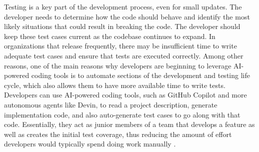 \documentclass[conference]{IEEEtran}
\begin{document}

 Testing is a key part of the development process, even for small updates. The developer needs to determine how the code should behave and identify the most likely situations that could result in breaking the code. The developer should keep these test cases current as the codebase continues to expand. In organizations that release frequently, there may be insufficient time to write adequate test cases and ensure that tests are executed correctly. Among other reasons, one of the main reasons why developers are beginning to leverage AI-powered coding tools is to automate sections of the development and testing life cycle, which also allows them to have more available time to write tests. Developers can use AI-powered coding tools, such as GitHub Copilot and more autonomous agents like Devin, to read a project description, generate implementation code, and also auto-generate test cases to go along with that code. Essentially, they act as junior members of a team that develops a feature as well as creates the initial test coverage, thus reducing the amount of effort developers would typically spend doing work manually \cite{yoshimoto2026testing,yuan2023no}.

\end{document}
